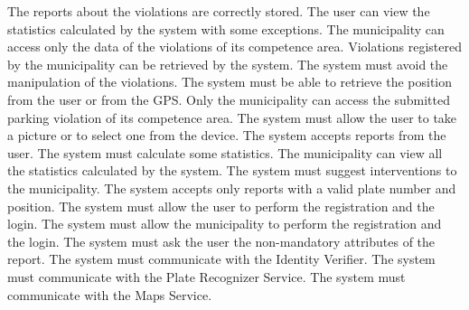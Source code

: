 \documentclass[../ATD.tex]{subfiles}
\begin{document}
    \begin{enumerate}
         The reports about the violations are correctly stored.
         The user can view the statistics calculated by the system with some exceptions.
         The municipality can access only the data of the violations of its competence area.
         Violations registered by the municipality can be retrieved by the system.
         The system must avoid the manipulation of the violations.
         The system must be able to retrieve the position from the user or from the GPS.
         Only the municipality can access the submitted parking violation of its competence area.
         The system must allow the user to take a picture or to select one from the device.
         The system accepts reports from the user.
         The system must calculate some statistics.
         The municipality can view all the statistics calculated by the system.
         The system must suggest interventions to the municipality.
         The system accepts only reports with a valid plate number and position.
         The system must allow the user to perform the registration and the login.
         The system must allow the municipality to perform the registration and the login.
         The system must ask the user the non-mandatory attributes of the report.
         The system must communicate with the Identity Verifier.
         The system must communicate with the Plate Recognizer Service.
         The system must communicate with the Maps Service.
    \end{enumerate}
\end{document}
